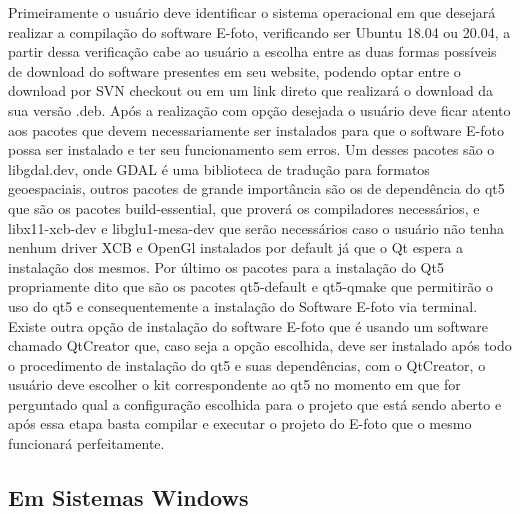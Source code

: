 Primeiramente o usuário deve identificar o sistema operacional em que desejará realizar a compilação do software E-foto, verificando ser Ubuntu 18.04 ou 20.04, a partir dessa verificação cabe ao usuário a escolha entre as duas formas possíveis de download do software presentes em seu website, podendo optar entre o download por SVN checkout ou em um link direto que realizará o download da sua versão .deb. Após a realização com opção desejada o usuário deve ficar atento aos pacotes que devem necessariamente ser instalados para que o software E-foto possa ser instalado e ter seu funcionamento sem erros. Um desses pacotes são o libgdal.dev, onde GDAL é uma biblioteca de tradução para formatos geoespaciais, outros pacotes de grande importância são os de dependência do qt5 que são os pacotes build-essential, que proverá os compiladores necessários, e libx11-xcb-dev e libglu1-mesa-dev que serão necessários caso o usuário não tenha nenhum driver XCB e OpenGl instalados por default já que o Qt espera a instalação dos mesmos. Por último os pacotes para a instalação do Qt5 propriamente dito que são os pacotes qt5-default e qt5-qmake que permitirão o uso do qt5 e consequentemente a instalação do Software E-foto via terminal. Existe outra opção de instalação do software E-foto que é usando um software chamado QtCreator que, caso seja a opção escolhida, deve ser instalado após todo o procedimento de instalação do qt5 e suas dependências, com o QtCreator, o usuário deve escolher o kit correspondente ao qt5 no momento em que for perguntado qual a configuração escolhida para o projeto que está sendo aberto e após essa etapa basta compilar e executar o projeto do E-foto que o mesmo funcionará perfeitamente.

\subsection{Em Sistemas Windows}